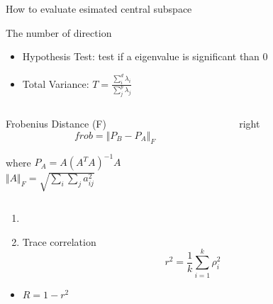 \documentclass[ignorenonframetext,]{beamer}
\providecommand{\tightlist}{%
  \setlength{\itemsep}{0pt}\setlength{\parskip}{0pt}}
\begin{document}
\begin{frame}{How to evaluate esimated central subspace}

\begin{block}{The number of direction}
\begin{itemize}
\item Hypothesis Test: test if a eigenvalue is significant than 0
\item Total Variance: $T = \frac{\sum_i^d \lambda_i}{\sum_j^p \lambda_j}$
\end{itemize}
\end{block}

\begin{columns}
\begin{column}{0.5\textwidth}
   \begin{block}{Frobenius Distance (F)}
    \[
      frob = \Vert P_B - P_A\Vert_F 
    \]
    
    where $P_A = A(A^TA)^{-1}A$ \\
    $\Vert A\Vert_F = \sqrt{\sum_i\sum_j a^2_{ij}}$
   \end{block}
\end{column}
\begin{column}{0.5\textwidth}  %
    \begin{block}{right}
    \end{block}
\end{column}
\end{columns}

\begin{enumerate}
\def\labelenumi{\arabic{enumi}.}
\item
\item
  Trace correlation \[
    r^2 = \frac{1}{k}\sum_{i=1}^k\rho_i^2
  \]
\end{enumerate}

\begin{itemize}
\tightlist
\item
  \(R = 1 - r^2\)
\end{itemize}

\end{frame}
\end{document}
